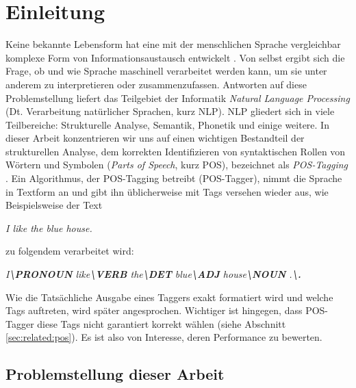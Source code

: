 %
\chapter{Einleitung}
\label{sec:intro}




Keine bekannte Lebensform hat eine mit der menschlichen Sprache vergleichbar komplexe Form von Informationsaustausch entwickelt \cite{Rao}. Von selbst ergibt sich die Frage, ob und wie Sprache maschinell verarbeitet werden kann, um sie unter anderem zu interpretieren oder zusammenzufassen. Antworten auf diese Problemstellung liefert das Teilgebiet der Informatik \textit{Natural Language Processing} (Dt. Verarbeitung natürlicher Sprachen, kurz NLP). NLP gliedert sich in viele Teilbereiche: Strukturelle Analyse, Semantik, Phonetik und einige weitere. In dieser Arbeit konzentrieren wir uns auf einen wichtigen Bestandteil der strukturellen Analyse, dem korrekten Identifizieren von syntaktischen Rollen von Wörtern und Symbolen (\textit{Parts of Speech}, kurz POS), bezeichnet als \textit{POS-Tagging} \cite{Smith}.
\newline
Ein Algorithmus, der POS-Tagging betreibt (POS-Tagger), nimmt die Sprache in Textform an und gibt ihn üblicherweise mit Tags versehen wieder aus, wie Beispielsweise der Text
\newline \newline
\centerline{\textit{I like the blue house.}}
	
 zu folgendem verarbeitet wird:
\newline \newline
\centerline{\textit{I\textbf{\textbackslash PRONOUN} like\textbf{\textbackslash VERB} the\textbf{\textbackslash DET} blue\textbf{\textbackslash ADJ} house\textbf{\textbackslash NOUN} .\textbf{\textbackslash .}}}

Wie die Tatsächliche Ausgabe eines Taggers exakt formatiert wird und welche Tags auftreten, wird später angesprochen. Wichtiger ist hingegen, dass POS-Tagger diese Tags nicht garantiert korrekt wählen (siehe Abschnitt \ref{sec:related:pos}). Es ist also von Interesse, deren Performance zu bewerten.


\section{Problemstellung dieser Arbeit}
\label{sec:intro:task}

